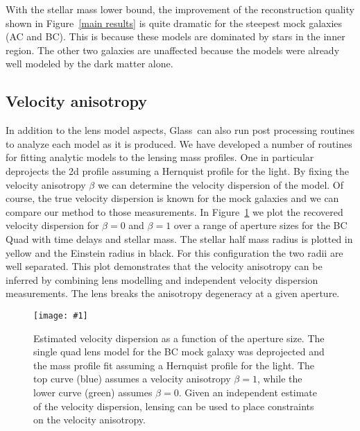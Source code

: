 \documentclass[galley,usenatbib]{mn2e}
\newcommand{\Glass}{{\sc Glass}}
\newcommand{\figref}[1] {Figure~\ref{#1}}
\newcommand\plotone[1]{%
 \centering
 \leavevmode
 \texttt{[image: \#1]}%
}%
\begin{document}
With the stellar mass lower bound, the improvement of the reconstruction
quality shown in \figref{main results} is quite dramatic for the
steepest mock galaxies (AC and BC). This is because these models are dominated
by stars in the inner region. The other two galaxies are unaffected because the
models were already well modeled by the dark matter alone.

\subsection{Velocity anisotropy}

In addition to the lens model aspects, \Glass\ can also run post processing
routines to analyze each model as it is produced. We have developed a number of
routines for fitting analytic models to the lensing mass profiles. One in
particular deprojects the 2d profile assuming a Hernquist profile for the
light. By fixing the velocity anisotropy $\beta$ we can determine the velocity
dispersion of the model. Of course, the true velocity dispersion is known for
the mock galaxies and we can compare our method to those measurements.  In
\figref{sigma-beta} we plot the recovered velocity dispersion for $\beta=0$ and $\beta=1$
over a range of aperture sizes for the BC Quad with time delays and stellar
mass. The stellar half mass radius is plotted in yellow and the Einstein radius
in black. For this configuration the two radii are well separated. This plot
demonstrates that the velocity anisotropy can be inferred by combining lens
modelling and independent velocity dispersion measurements. The lens breaks
the anisotropy degeneracy at a given aperture.

\begin{figure}
\plotone{BCQuadR1a_TmS-sb.pdf}
\caption{Estimated velocity dispersion as a function of the aperture size. The
single quad lens model for the BC mock galaxy was deprojected and the mass
profile fit assuming a Hernquist profile for the light. The top curve (blue)
assumes a velocity anisotropy $\beta=1$, while the lower curve (green)
assumes $\beta=0$. Given an independent estimate of the velocity dispersion,
lensing can be used to place constraints on the velocity anisotropy.}
\label{sigma-beta}
\end{figure}

%
\end{document}
